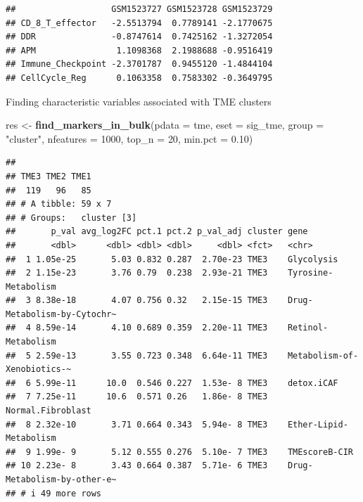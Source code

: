 \documentclass[
  12pt,
]{book}
\newenvironment{Shaded}{\begin{snugshade}}{\end{snugshade}}
\newcommand{\AttributeTok}[1]{\textcolor[rgb]{0.13,0.29,0.53}{#1}}
\newcommand{\DecValTok}[1]{\textcolor[rgb]{0.00,0.00,0.81}{#1}}
\newcommand{\FloatTok}[1]{\textcolor[rgb]{0.00,0.00,0.81}{#1}}
\newcommand{\FunctionTok}[1]{\textcolor[rgb]{0.13,0.29,0.53}{\textbf{#1}}}
\newcommand{\NormalTok}[1]{#1}
\newcommand{\OtherTok}[1]{\textcolor[rgb]{0.56,0.35,0.01}{#1}}
\newcommand{\StringTok}[1]{\textcolor[rgb]{0.31,0.60,0.02}{#1}}
\begin{document}
\begin{verbatim}
##                   GSM1523727 GSM1523728 GSM1523729
## CD_8_T_effector   -2.5513794  0.7789141 -2.1770675
## DDR               -0.8747614  0.7425162 -1.3272054
## APM                1.1098368  2.1988688 -0.9516419
## Immune_Checkpoint -2.3701787  0.9455120 -1.4844104
## CellCycle_Reg      0.1063358  0.7583302 -0.3649795
\end{verbatim}

Finding characteristic variables associated with TME clusters

\begin{Shaded}
\begin{Highlighting}[]
\NormalTok{res }\OtherTok{\textless{}{-}} \FunctionTok{find\_markers\_in\_bulk}\NormalTok{(}\AttributeTok{pdata =}\NormalTok{ tme, }\AttributeTok{eset =}\NormalTok{ sig\_tme, }\AttributeTok{group =} \StringTok{"cluster"}\NormalTok{, }\AttributeTok{nfeatures =} \DecValTok{1000}\NormalTok{, }\AttributeTok{top\_n =} \DecValTok{20}\NormalTok{, }\AttributeTok{min.pct =} \FloatTok{0.10}\NormalTok{)}
\end{Highlighting}
\end{Shaded}

\begin{verbatim}
## 
## TME3 TME2 TME1 
##  119   96   85 
## # A tibble: 59 x 7
## # Groups:   cluster [3]
##       p_val avg_log2FC pct.1 pct.2 p_val_adj cluster gene                       
##       <dbl>      <dbl> <dbl> <dbl>     <dbl> <fct>   <chr>                      
##  1 1.05e-25       5.03 0.832 0.287  2.70e-23 TME3    Glycolysis                 
##  2 1.15e-23       3.76 0.79  0.238  2.93e-21 TME3    Tyrosine-Metabolism        
##  3 8.38e-18       4.07 0.756 0.32   2.15e-15 TME3    Drug-Metabolism-by-Cytochr~
##  4 8.59e-14       4.10 0.689 0.359  2.20e-11 TME3    Retinol-Metabolism         
##  5 2.59e-13       3.55 0.723 0.348  6.64e-11 TME3    Metabolism-of-Xenobiotics-~
##  6 5.99e-11      10.0  0.546 0.227  1.53e- 8 TME3    detox.iCAF                 
##  7 7.25e-11      10.6  0.571 0.26   1.86e- 8 TME3    Normal.Fibroblast          
##  8 2.32e-10       3.71 0.664 0.343  5.94e- 8 TME3    Ether-Lipid-Metabolism     
##  9 1.99e- 9       5.12 0.555 0.276  5.10e- 7 TME3    TMEscoreB-CIR              
## 10 2.23e- 8       3.43 0.664 0.387  5.71e- 6 TME3    Drug-Metabolism-by-other-e~
## # i 49 more rows
\end{verbatim}
\end{document}
